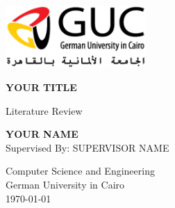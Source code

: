\begin{titlepage}
  \begin{center}
      \includegraphics[width=0.4\textwidth]{guc_logo_og.png}
      \vspace*{1cm}

      \textbf{YOUR TITLE}
      \vspace{0.5cm}

       Literature Review
      \vspace{1.0cm}

      \textbf{YOUR NAME} \\
      \vspace{0.5cm}
      Supervised By: SUPERVISOR NAME
      \vfill

      Computer Science and Engineering\\
      German University in Cairo\\
      \today
  \end{center}
\end{titlepage}

\renewcommand\bibname{References}

\newcommand{\makeaparahraph}[2]{
  \begin{flushleft}
    \textbf{#1}#2
  \end{flushleft}
}

\newcommand{\makepapersummery}[6]{
  \makeaparahraph{Category: }{#1}
  \makeaparahraph{Title: }{#2}
  \makeaparahraph{Authors: }{#3}
  \makeaparahraph{Source: }{#4}
  \makeaparahraph{Abstract: }{#5}
  \makeaparahraph{Analysis: }{#6}
  \vspace{2cm}
}